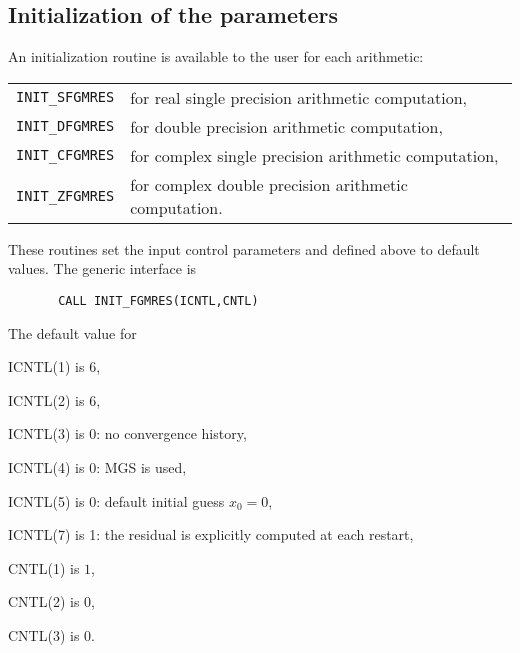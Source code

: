 \subsection{Initialization of the parameters}
%
An initialization routine is available to the user for each arithmetic:
\begin{center}
\begin{tabularx}{\linewidth}{l X}
 \texttt{INIT\_SFGMRES} & for real single precision arithmetic computation, \\
 \texttt{INIT\_DFGMRES} & for double precision arithmetic computation, \\
 \texttt{INIT\_CFGMRES} & for complex single precision arithmetic
                        computation,\\
 \texttt{INIT\_ZFGMRES} & for complex double precision arithmetic computation.
\\
\end{tabularx}
\end{center}
These routines set the input control parameters  and
 defined above to default values.
The generic interface is
\begin{verbatim}
       CALL INIT_FGMRES(ICNTL,CNTL)
\end{verbatim}
The default value for
\begin{listparam}
 \item[ICNTL(1)]  is 6,
 \item[ICNTL(2)]  is 6,
 \item[ICNTL(3)]  is 0: no convergence history,
 \item[ICNTL(4)]  is 0: MGS is used,
 \item[ICNTL(5)]  is 0: default initial guess $x_0 = 0$,
 \item[ICNTL(7)]  is 1: the residual is explicitly computed at each restart,
 \item[CNTL(1)]   is $1$,
 \item[CNTL(2)]   is $0$,
 \item[CNTL(3)]   is $0$.
\end{listparam}  
%
